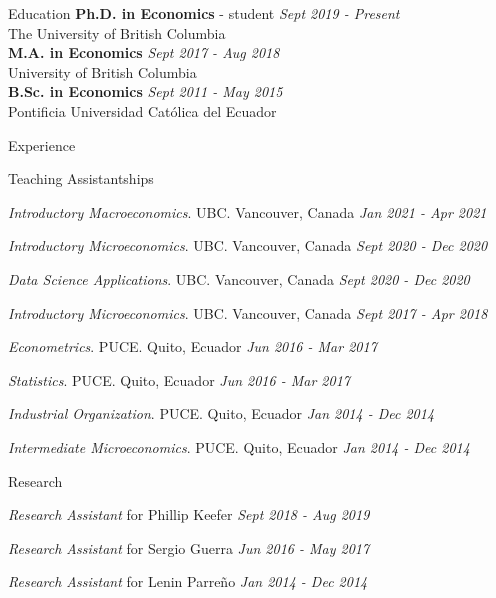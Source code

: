 \documentclass{resume}
\begin{document}
  \begin{rSection}{Education}
    {\bf Ph.D. in Economics } {- student} \hfill {\em Sept 2019 - Present} \\ 
    { The University of British Columbia }\\ 
    {\bf M.A. in Economics } \hfill {\em Sept 2017 - Aug 2018} \\ 
    { University of British Columbia } \\
    {\bf B.Sc. in Economics } \hfill {\em Sept 2011 - May 2015} \\ 
    { Pontificia Universidad Católica del Ecuador } \\
  \end{rSection}
  
  \begin{rSection}{Experience}
    
    \begin{rSubsection}{Teaching Assistantships}{}{}{}
    \item {\em Introductory Macroeconomics}. UBC. Vancouver, Canada \hfill{\em Jan 2021 - Apr 2021}
    \item {\em Introductory Microeconomics}. UBC. Vancouver, Canada \hfill{\em Sept 2020 - Dec 2020}
    \item {\em Data Science Applications}. UBC. Vancouver, Canada \hfill{\em Sept 2020 - Dec 2020}
    \item {\em Introductory Microeconomics}. UBC. Vancouver, Canada \hfill{\em Sept 2017 - Apr 2018}
    \item {\em Econometrics}. PUCE. Quito, Ecuador \hfill{\em Jun 2016 - Mar 2017}
    \item {\em Statistics}. PUCE. Quito, Ecuador \hfill{\em Jun 2016 - Mar 2017}
    \item {\em Industrial Organization}. PUCE. Quito, Ecuador \hfill{\em Jan 2014 - Dec 2014}
    \item {\em Intermediate Microeconomics}. PUCE. Quito, Ecuador \hfill{\em Jan 2014 - Dec 2014}
    \end{rSubsection}
  
    \begin{rSubsection}{Research}{}{}{}
    \item {\em Research Assistant} for Phillip Keefer \hfill{\em Sept 2018 - Aug 2019}
    \item {\em Research Assistant} for Sergio Guerra \hfill{\em Jun 2016 - May 2017}
    \item {\em Research Assistant} for Lenin Parreño \hfill{\em Jan 2014 - Dec 2014}
    \end{rSubsection}


\end{rSection}
\end{document}
